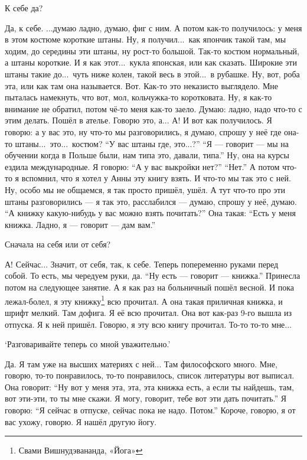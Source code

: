 \M
К себе да?

\I
Да, к себе.
...думаю ладно, думаю, фиг с ним.
А потом как-то получилось: у меня в этом костюме короткие штаны.
Ну, я получил...\ как япончик такой там, мы ходим, до середины эти штаны, ну рост-то большой.
Так-то костюм нормальный, а штаны короткие. И я как этот...\ кукла японская, или как сказать.
Широкие эти штаны такие до...\ чуть ниже колен, такой весь в этой...\ в рубашке.
Ну, вот, роба эта, или как там она называется.
Вот.
Как-то это неказисто выглядело.
Мне пыталась намекнуть, что вот, мол, кольчужка-то коротковата.
Ну, я как-то внимание не обратил, потом чё-то меня как-то заело.
Думаю: ладно, надо что-то с этим делать.
Пошёл в ателье.
Говорю это, а... А! И вот как получилось.
Я говорю: а у вас это, ну что-то мы разговорились,
я думаю, спрошу у неё где она-то штаны...\ это...\ костюм?
``У вас штаны где, это...?''
``Я --- говорит --- мы на обучении когда в Польше были, нам типа это, давали, типа.''
Ну, она на курсы ездила международные.
Я говорю: ``А у вас выкройки нет?''
``Нет.''
А потом что-то я вспомнил, что я хотел у Анны эту книгу взять.
И что-то мы так это с ней.
Ну, особо мы не общаемся, я так просто пришёл, ушёл.
А тут что-то про эти штаны разговорились --- я так это, расслабился --- думаю, спрошу у неё,
думаю. ``А книжку какую-нибудь у вас можно взять почитать?''
Она такая: ``Есть у меня книжка. Ладно, я --- говорит --- дам вам.''

\M
Сначала на себя или от себя?

\I
А! Сейчас... Значит, от себя, так, к себе.
Теперь попеременно руками перед собой.
То есть, мы чередуем руки, да.
``Ну есть --- говорит --- книжка.''
Принесла потом на следующее занятие.
А я как раз на больничный пошёл весной. И пока лежал-болел, я эту
книжку\footnote*{Свами Вишнудэвананда, «Йога»} всю прочитал. А она такая приличная книжка, и шрифт мелкий.
Там дофига. Я её всю прочитал.
Она вот как-раз 9-го вышла из отпуска. Я к ней пришёл.
Говорю, я эту всю книгу прочитал. То-то то-то мне...

\M
`Разговаривайте теперь со мной уважительно.'

\I
Да. Я там уже на высших материях с ней... Там философского много.
Мне, говорю, то-то понравилось, то-то понравилось, список литературы вот выписал.
Она говорит: ``Ну вот у меня эта, эта, эта книжка есть, а если ты найдешь, там, вот эти-эти,
то ты мне скажи. Я могу, говорит, тебе вот эти дать почитать.''
Я говорю: ``Я сейчас в отпуске, сейчас пока не надо. Потом.''
Короче, говорю, я от вас ухожу, говорю. Я нашёл другую йогу.

